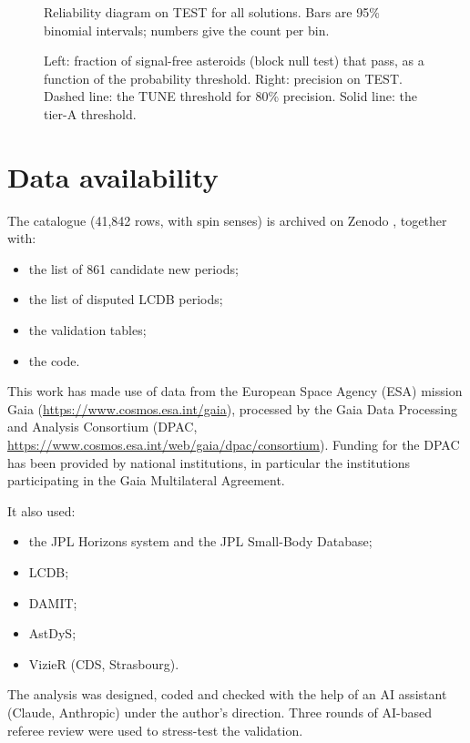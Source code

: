 \documentclass[twocolumn]{aastex631}
\begin{document}
\begin{figure}
\caption{Reliability diagram on TEST for all solutions. Bars are 95\% binomial intervals; numbers give the
count per bin.\label{fig:rel}}
\end{figure}

\begin{figure}
\caption{Left: fraction of signal-free asteroids (block null test) that pass, as a function of the
probability threshold. Right: precision on TEST. Dashed line: the TUNE threshold for 80\% precision. Solid
line: the tier-A threshold.\label{fig:thr}}
\end{figure}

\section{Data availability}

The catalogue (41{,}842 rows, with spin senses) is archived on Zenodo \citep{Tropynin2026b},
together with:
\begin{itemize}
\item the list of 861 candidate new periods;
\item the list of disputed LCDB periods;
\item the validation tables;
\item the code.
\end{itemize}

\begin{acknowledgments}
This work has made use of data from the European Space Agency (ESA) mission Gaia
(\url{https://www.cosmos.esa.int/gaia}), processed by the Gaia Data Processing and Analysis Consortium (DPAC,
\url{https://www.cosmos.esa.int/web/gaia/dpac/consortium}). Funding for the DPAC has been provided by
national institutions, in particular the institutions participating in the Gaia Multilateral Agreement.

It also used:
\begin{itemize}
\item the JPL Horizons system and the JPL Small-Body Database;
\item LCDB;
\item DAMIT;
\item AstDyS;
\item VizieR (CDS, Strasbourg).
\end{itemize}

The analysis was designed, coded and checked with the help of an AI assistant (Claude, Anthropic) under
the author's direction. Three rounds of AI-based referee review were used to stress-test the validation.
\end{acknowledgments}
\end{document}
